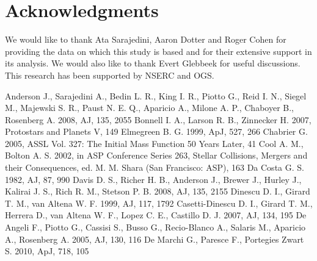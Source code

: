 \section*{Acknowledgments}

We would like to thank Ata Sarajedini, Aaron Dotter and Roger Cohen
for providing the data on which this study is based and for their
extensive support in its analysis.  We would also like to thank Evert
Glebbeek for useful discussions.  This research has been
supported by NSERC and OGS.


\begin{thebibliography}{99}

  Anderson J.,  Sarajedini A., Bedin L. R., King I. R., Piotto G.,
  Reid I. N., Siegel M., Majewski S. R., Paust N. E. Q., Aparicio A.,
  Milone A. P., Chaboyer B., Rosenberg A. 2008, AJ, 135, 2055
 Bonnell I. A., Larson R. B.,
  Zinnecker H. 2007, Protostars and Planets V, 149 
  Elmegreen B. G. 1999, ApJ, 527, 266
 Chabrier
  G. 2005, ASSL Vol. 327: The Initial Mass Function 50 Years Later, 41
 Cool
  A. M., Bolton
  A. S. 2002, in ASP Conference Series 263, Stellar Collisions,
  Mergers and their Consequences, ed. M. M. Shara (San Francisco:
  ASP), 163
 Da Costa
  G. S. 1982, AJ, 87, 990
  Davis D. S., Richer H. B., Anderson J., Brewer J., Hurley J.,
  Kalirai J. S., Rich R. M., Stetson P. B. 2008, AJ, 135, 2155
  Dinescu D. I., Girard T. M., van Altena W. F. 1999, AJ, 117, 1792
  Casetti-Dinescu D. I., Girard T. M., Herrera D., van Altena W. F.,
  Lopez C. E., Castillo D. J. 2007, AJ, 134, 195
  De Angeli F., Piotto G., Cassisi S., Busso G., Recio-Blanco A.,
  Salaris M., Aparicio A., Rosenberg A. 2005, AJ, 130, 116
 De Marchi G., Paresce F., Portegies
  Zwart S. 2010, ApJ, 718, 105

\end{thebibliography}

